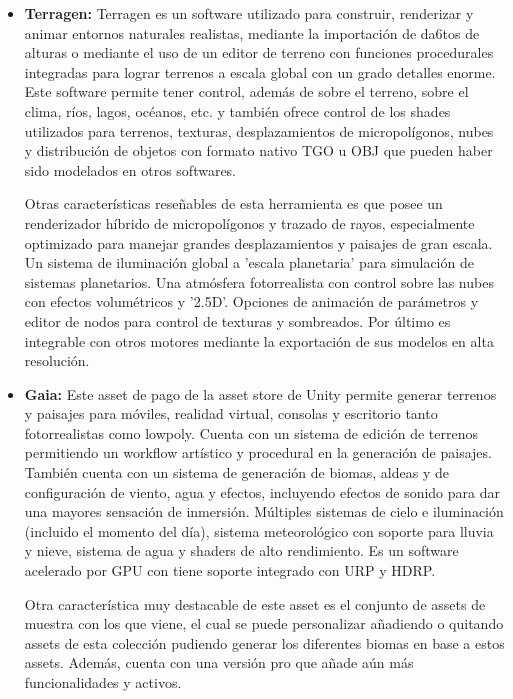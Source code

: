 \begin{itemize}[label=\textbullet]
                \item \textbf{Terragen: }
                Terragen es un software utilizado para construir, renderizar y animar entornos naturales realistas, mediante la importación de da6tos de alturas o mediante el uso de un editor de terreno con funciones procedurales integradas para lograr terrenos a escala global con un grado detalles enorme. Este software permite tener control, además de sobre el terreno, sobre el clima, ríos, lagos, océanos, etc. y también ofrece control de los shades utilizados para terrenos, texturas, desplazamientos de micropolígonos, nubes y distribución de objetos con formato nativo TGO u OBJ que pueden haber sido modelados en otros softwares. 

                Otras características reseñables de esta herramienta es que posee un renderizador híbrido de micropolígonos y trazado de rayos, especialmente optimizado para manejar grandes desplazamientos y paisajes de gran escala. Un sistema de iluminación global a 'escala planetaria' para simulación de sistemas planetarios. Una atmósfera fotorrealista con control sobre las nubes con efectos volumétricos y '2.5D'. Opciones de animación de parámetros y editor de nodos para control de texturas y sombreados. Por último es integrable con otros motores mediante la exportación de sus modelos en alta resolución. \cite{TerragenOverview}
                
                \item \textbf{Gaia:}
                Este asset de pago de la asset store de Unity permite generar terrenos y paisajes para móviles, realidad virtual, consolas y escritorio tanto fotorrealistas como lowpoly. Cuenta con un sistema de edición de terrenos permitiendo un workflow artístico y procedural en la generación de paisajes. También cuenta con un sistema de generación de biomas, aldeas y de configuración de viento, agua y efectos, incluyendo efectos de sonido para dar una mayores sensación de inmersión. Múltiples sistemas de cielo e iluminación (incluido el momento del día), sistema meteorológico con soporte para lluvia y nieve, sistema de agua y shaders de alto rendimiento. Es un software acelerado por GPU con tiene soporte integrado con URP y HDRP.

                Otra característica muy destacable de este asset es el conjunto de assets de muestra con los que viene, el cual se puede personalizar añadiendo o quitando assets de esta colección pudiendo generar los diferentes biomas en base a estos assets. Además, cuenta con una versión pro que añade aún más funcionalidades y activos. \cite{unity-assetstore-terrain-generator-vista-pro} \cite{GaiaPro}
                

\end{itemize}
